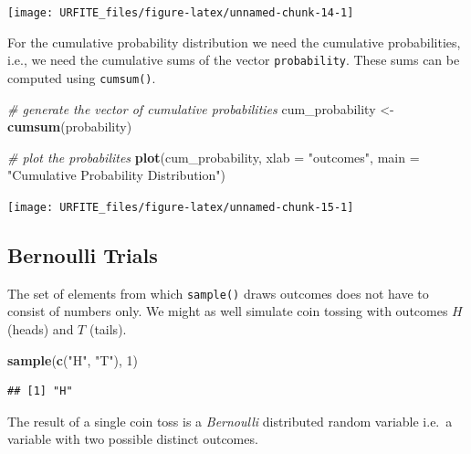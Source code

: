 \documentclass[]{book}
\newenvironment{Shaded}{\begin{snugshade}}{\end{snugshade}}
\newcommand{\KeywordTok}[1]{\textcolor[rgb]{0.13,0.29,0.53}{\textbf{#1}}}
\newcommand{\DataTypeTok}[1]{\textcolor[rgb]{0.13,0.29,0.53}{#1}}
\newcommand{\DecValTok}[1]{\textcolor[rgb]{0.00,0.00,0.81}{#1}}
\newcommand{\StringTok}[1]{\textcolor[rgb]{0.31,0.60,0.02}{#1}}
\newcommand{\CommentTok}[1]{\textcolor[rgb]{0.56,0.35,0.01}{\textit{#1}}}
\newcommand{\NormalTok}[1]{#1}
\theoremstyle{definition}
\theoremstyle{definition}
\theoremstyle{definition}
\theoremstyle{remark}
\begin{document}
\begin{center}\texttt{[image: URFITE\_files/figure-latex/unnamed-chunk-14-1]} \end{center}

For the cumulative probability distribution we need the cumulative
probabilities, i.e., we need the cumulative sums of the vector
\texttt{probability}. These sums can be computed using
\texttt{cumsum()}.

\begin{Shaded}
\begin{Highlighting}[]
\CommentTok{# generate the vector of cumulative probabilities }
\NormalTok{cum_probability <-}\StringTok{ }\KeywordTok{cumsum}\NormalTok{(probability) }

\CommentTok{# plot the probabilites }
\KeywordTok{plot}\NormalTok{(cum_probability, }
     \DataTypeTok{xlab =} \StringTok{"outcomes"}\NormalTok{, }
     \DataTypeTok{main =} \StringTok{"Cumulative Probability Distribution"}\NormalTok{) }
\end{Highlighting}
\end{Shaded}

\begin{center}\texttt{[image: URFITE\_files/figure-latex/unnamed-chunk-15-1]} \end{center}

\subsection*{Bernoulli Trials}\label{bernoulli-trials}

The set of elements from which \texttt{sample()} draws outcomes does not
have to consist of numbers only. We might as well simulate coin tossing
with outcomes \(H\) (heads) and \(T\) (tails).

\begin{Shaded}
\begin{Highlighting}[]
\KeywordTok{sample}\NormalTok{(}\KeywordTok{c}\NormalTok{(}\StringTok{"H"}\NormalTok{, }\StringTok{"T"}\NormalTok{), }\DecValTok{1}\NormalTok{) }
\end{Highlighting}
\end{Shaded}

\begin{verbatim}
## [1] "H"
\end{verbatim}

The result of a single coin toss is a \emph{Bernoulli} distributed
random variable i.e.~a variable with two possible distinct outcomes.
\end{document}
